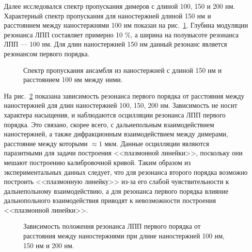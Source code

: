 Далее исследовался спектр пропускания димеров с длиной 100, 150 и 200 нм. Характерный спектр пропускания для наностержней длиной 150 нм и расстоянием между наностержнями 100 нм показан на рис.~\ref{img:Spectraa1d1}. Глубина модуляции резонанса ЛПП составляет примерно 10 \%, а ширина на полувысоте резонанса ЛПП --- 100 нм. Для длин наностержней 150 нм данный резонанс является резонансом первого порядка.
\begin{figure}
\caption{Спектр пропускания ансамбля из наностержней с длиной 150 нм и расстоянием 100 нм между ними.}
\label{img:Spectraa1d1}
\end{figure}

На рис.~\ref{img:1res} показана зависимость резонанса первого порядка от расстояния между наностержней для длин наностержней 100, 150, 200 нм. Зависимость не носит характера насыщения, и наблюдаются осцилляции резонанса ЛПП первого порядка. Это связано, скорее всего, с дальнепольным взаимодействием наностержней, а также дифракционным взаимодействием между димерами, расстояние между которыми $ \approx 1$ мкм. Данные осцилляции являются паразитными для задачи построения <<плазмонной линейки>>, поскольку они мешают построению калибровочной кривой. Таким образом из экспериментальных данных следует, что для резонанса второго порядка возможно построить <<плазмонную линейку>> из-за его слабой чувствительности к дальнепольному взаимодействию, а для резонанса первого порядка влияние дальнопольного взаимодействия приводят к невозможности построения <<плазмонной линейки>>.
\begin{figure}
\caption{Зависимость положения резонанса ЛПП первого порядка от расстояния между наностержнями при длине наностержней 100 нм, 150 нм и 200 нм.}
\label{img:1res}
\end{figure}


